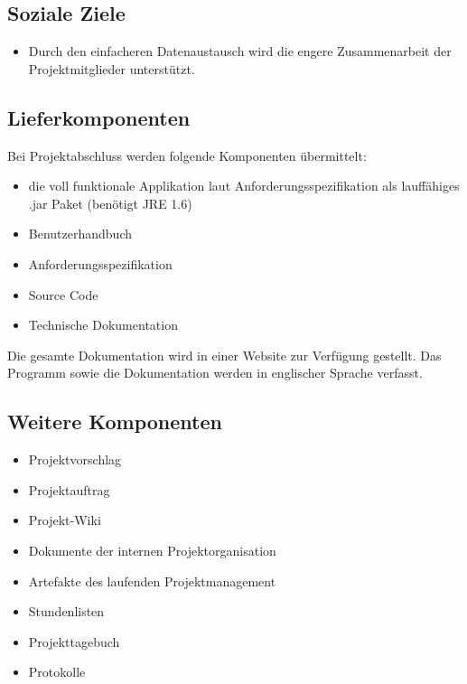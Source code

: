 \subsection{Soziale Ziele}
\begin{itemize}
\item Durch den einfacheren Datenaustausch wird die engere Zusammenarbeit der Projektmitglieder unterstützt.
\end{itemize}

\subsection{Lieferkomponenten}
Bei Projektabschluss werden folgende Komponenten übermittelt:
\begin{itemize}
\item die voll funktionale Applikation laut Anforderungsspezifikation als lauffähiges .jar Paket (benötigt JRE 1.6)
\item Benutzerhandbuch
\item Anforderungsspezifikation
\item Source Code
\item Technische Dokumentation
\end{itemize}

Die gesamte Dokumentation wird in einer Website zur Verfügung gestellt. Das Programm sowie die Dokumentation werden in englischer Sprache verfasst.

\subsection{Weitere Komponenten}
\begin{itemize}
\item Projektvorschlag
\item Projektauftrag
\item Projekt-Wiki
\item Dokumente der internen Projektorganisation
\item Artefakte des laufenden Projektmanagement
\item Stundenlisten
\item Projekttagebuch
\item Protokolle
\end{itemize}
